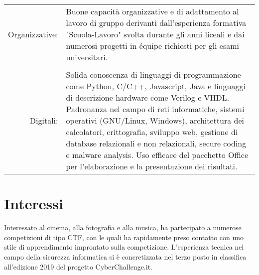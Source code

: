 \documentclass[a4paper,10pt]{article} %
\begin{document}
\begin{tabular}{rl}
\multicolumn{1}{p{2cm}}{Organizzative:} & \multicolumn{1}{p{11.5cm}}{Buone capacità organizzative e di adattamento al lavoro di gruppo derivanti dall'esperienza formativa "Scuola-Lavoro" svolta durante gli anni liceali e dai numerosi progetti in équipe richiesti per gli esami universitari.}\\
\\

\multicolumn{1}{p{2cm}}{Digitali:} & \multicolumn{1}{p{11.5cm}}{Solida conoscenza di linguaggi di programmazione come Python, C/C++, Javascript, Java e linguaggi di descrizione hardware come Verilog e VHDL. Padronanza nel campo di reti informatiche, sistemi operativi (GNU/Linux, Windows), architettura dei calcolatori, crittografia, sviluppo web, gestione di database relazionali e non relazionali, secure coding e malware analysis. Uso efficace del pacchetto Office per l'elaborazione e la presentazione dei risultati.}\\
\end{tabular}


\section{Interessi}

Interessato al cinema, alla fotografia e alla musica, ha partecipato a numerose competizioni di tipo CTF, con le quali ha rapidamente preso contatto con uno stile di apprendimento improntato sulla competizione. L'esperienza tecnica nel campo della sicurezza informatica si è concretizzata nel terzo posto in classifica all'edizione 2019 del progetto CyberChallenge.it.


\end{document}
